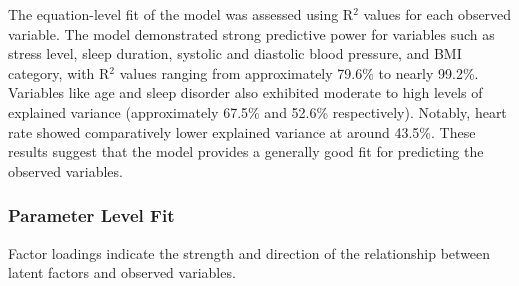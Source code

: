 \documentclass[11pt]{article}
\begin{document}
		The equation-level fit of the model was assessed using R$^2$ values for each observed variable. The model demonstrated strong predictive power for variables such as stress level, sleep duration, systolic and diastolic blood pressure, and BMI category, with R$^2$ values ranging from approximately 79.6\% to nearly 99.2\%. Variables like age and sleep disorder also exhibited moderate to high levels of explained variance (approximately 67.5\% and 52.6\% respectively). Notably, heart rate showed comparatively lower explained variance at around 43.5\%. These results suggest that the model provides a generally good fit for predicting the observed variables.
		
		\subsubsection{Parameter Level Fit}
		
			Factor loadings indicate the strength and direction of the relationship between latent factors and observed variables.
		
\end{document}
